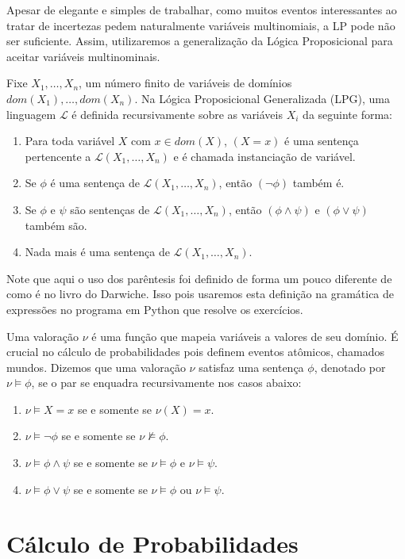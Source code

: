 \documentclass[paper=a4, fontsize=11pt]{scrartcl} %
\numberwithin{equation}{subsection}
\numberwithin{figure}{subsection}
\numberwithin{table}{subsection}
\numberwithin{definition}{subsection}
\numberwithin{theorem}{subsection}
\numberwithin{property}{subsection}
\numberwithin{proposition}{subsection}
\numberwithin{equation}{section}
\numberwithin{figure}{section}
\numberwithin{table}{section}
\numberwithin{definition}{section}
\numberwithin{theorem}{section}
\numberwithin{property}{section}
\numberwithin{proposition}{section}
\newcommand{\set}[1]{\mathcal{#1}}
\begin{document}
Apesar de elegante e simples de trabalhar, como muitos eventos interessantes ao tratar de incertezas pedem naturalmente variáveis multinomiais, a LP pode não ser suficiente. Assim, utilizaremos a generalização da Lógica Proposicional para aceitar variáveis multinominais.

Fixe $X_1, \dotsc, X_n$, um número finito de variáveis de domínios $dom(X_1), \dotsc, dom(X_n)$. Na Lógica Proposicional Generalizada (LPG), uma linguagem $\set{L}$ é definida recursivamente sobre as variáveis $X_i$ da seguinte forma:
\begin{enumerate}
\item Para toda variável $X$ com $x \in dom(X)$, $(X=x)$ é uma sentença pertencente a $\set{L}(X_1, \dotsc, X_n)$ e é chamada instanciação de variável.
\item Se $\phi$ é uma sentença de $\set{L}(X_1, \dotsc, X_n)$, então $(\neg \phi)$ também é.
\item Se $\phi$ e $\psi$ são sentenças de $\set{L}(X_1, \dotsc, X_n)$, então $(\phi \land \psi)$ e $(\phi \lor \psi)$ também são.
\item Nada mais é uma sentença de $\set{L}(X_1, \dotsc, X_n)$.
\end{enumerate}

Note que aqui o uso dos parêntesis foi definido de forma um pouco diferente de como é no livro do Darwiche. Isso pois usaremos esta definição na gramática de expressões no programa em Python que resolve os exercícios.

Uma valoração $\nu$ é uma função que mapeia variáveis a valores de seu domínio. É crucial no cálculo de probabilidades pois definem eventos atômicos, chamados mundos. Dizemos que uma valoração $\nu$ satisfaz uma sentença $\phi$, denotado por $\nu \models \phi$, se o par se enquadra recursivamente nos casos abaixo:  
\begin{enumerate}
\item $\nu \models X=x$ se e somente se $\nu(X)=x$.
\item $\nu \models \neg \phi$ se e somente se $\nu \not\models \phi$.
\item $\nu \models \phi \wedge \psi$ se e somente se
  $\nu \models \phi$ e $\nu \models \psi$.
\item $\nu \models \phi \vee \psi$ se e somente se
  $\nu \models \phi$ ou $\nu \models \psi$.
\end{enumerate}

\section{Cálculo de Probabilidades}
\end{document}
